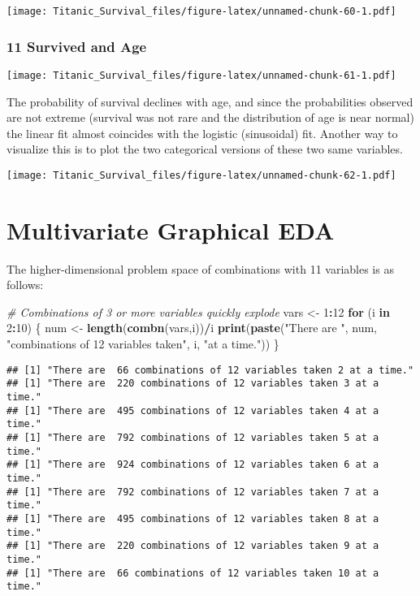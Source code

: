 \documentclass[]{article}
\newenvironment{Shaded}{\begin{snugshade}}{\end{snugshade}}
\newcommand{\KeywordTok}[1]{\textcolor[rgb]{0.13,0.29,0.53}{\textbf{#1}}}
\newcommand{\DecValTok}[1]{\textcolor[rgb]{0.00,0.00,0.81}{#1}}
\newcommand{\StringTok}[1]{\textcolor[rgb]{0.31,0.60,0.02}{#1}}
\newcommand{\CommentTok}[1]{\textcolor[rgb]{0.56,0.35,0.01}{\textit{#1}}}
\newcommand{\ControlFlowTok}[1]{\textcolor[rgb]{0.13,0.29,0.53}{\textbf{#1}}}
\newcommand{\OperatorTok}[1]{\textcolor[rgb]{0.81,0.36,0.00}{\textbf{#1}}}
\newcommand{\NormalTok}[1]{#1}
\begin{document}
\texttt{[image: Titanic\_Survival\_files/figure-latex/unnamed-chunk-60-1.pdf]}

\subsubsection{11 Survived and Age}\label{survived-and-age}

\texttt{[image: Titanic\_Survival\_files/figure-latex/unnamed-chunk-61-1.pdf]}

The probability of survival declines with age, and since the
probabilities observed are not extreme (survival was not rare and the
distribution of age is near normal) the linear fit almost coincides with
the logistic (sinusoidal) fit. Another way to visualize this is to plot
the two categorical versions of these two same variables.

\texttt{[image: Titanic\_Survival\_files/figure-latex/unnamed-chunk-62-1.pdf]}

\hypertarget{multigraphEDA-link}{\section{Multivariate Graphical
EDA}\label{multigraphEDA-link}}

The higher-dimensional problem space of combinations with 11 variables
is as follows:

\begin{Shaded}
\begin{Highlighting}[]
\CommentTok{# Combinations of 3 or more variables quickly explode}
\NormalTok{vars <-}\StringTok{ }\DecValTok{1}\OperatorTok{:}\DecValTok{12}
\ControlFlowTok{for}\NormalTok{ (i }\ControlFlowTok{in} \DecValTok{2}\OperatorTok{:}\DecValTok{10}\NormalTok{) \{}
\NormalTok{    num <-}\StringTok{ }\KeywordTok{length}\NormalTok{(}\KeywordTok{combn}\NormalTok{(vars,i))}\OperatorTok{/}\NormalTok{i}
    \KeywordTok{print}\NormalTok{(}\KeywordTok{paste}\NormalTok{(}\StringTok{"There are "}\NormalTok{, num, }\StringTok{"combinations of 12 variables taken"}\NormalTok{, i, }\StringTok{"at a time."}\NormalTok{))}
\NormalTok{\}}
\end{Highlighting}
\end{Shaded}

\begin{verbatim}
## [1] "There are  66 combinations of 12 variables taken 2 at a time."
## [1] "There are  220 combinations of 12 variables taken 3 at a time."
## [1] "There are  495 combinations of 12 variables taken 4 at a time."
## [1] "There are  792 combinations of 12 variables taken 5 at a time."
## [1] "There are  924 combinations of 12 variables taken 6 at a time."
## [1] "There are  792 combinations of 12 variables taken 7 at a time."
## [1] "There are  495 combinations of 12 variables taken 8 at a time."
## [1] "There are  220 combinations of 12 variables taken 9 at a time."
## [1] "There are  66 combinations of 12 variables taken 10 at a time."
\end{verbatim}
\end{document}
